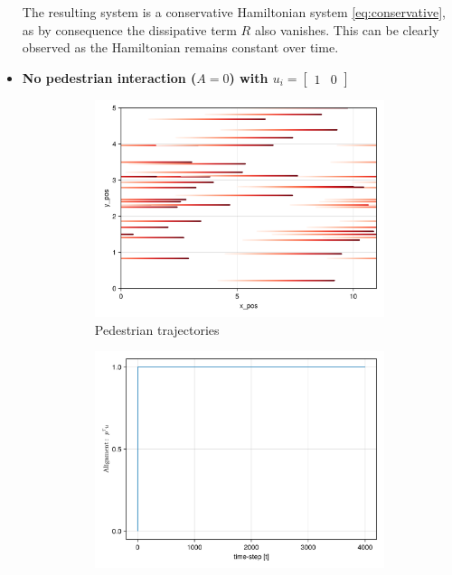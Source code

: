 \begin{itemize}
The resulting system is a conservative Hamiltonian system \autoref{eq:conservative}, as by consequence the dissipative term $R$ also vanishes. This can be clearly observed as the Hamiltonian remains constant over time.

\item \textbf{No pedestrian interaction ($A = 0$) with $u_i = \begin{bmatrix} 1 & 0 \end{bmatrix}$}
\begin{figure}[H]
    \centering
    \begin{subfigure}{.49\textwidth}
        \centering
        \includegraphics[width=\linewidth]{figures/ch5_basic/traj_nointeraction_4000.png}
        \caption{Pedestrian trajectories}
        \label{plot:nointeraction_traj}
    \end{subfigure}
    \begin{subfigure}{.49\textwidth}
        \centering
        \includegraphics[width=\linewidth]{figures/ch5_basic/straight_nointeraction.png}

\end{subfigure}
\end{figure}
\end{itemize}
